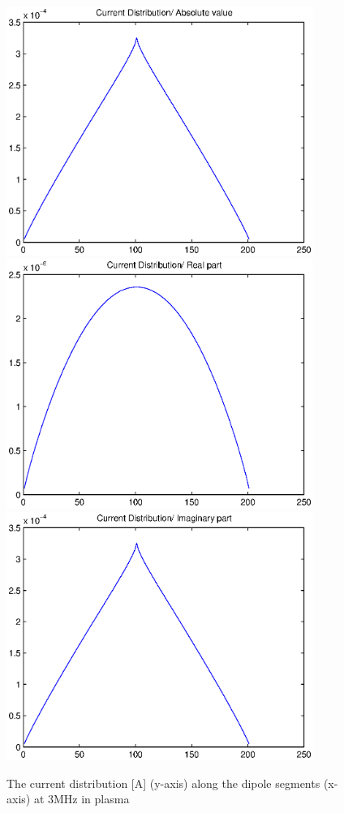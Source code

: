 \documentclass[a4paper,11pt]{thesis}
\begin{document}
\begin{figure}
 \begin{center}
\includegraphics[width=10.0cm]{DissPics/curr_abs_3mh_p.eps}
 \includegraphics[width=10.0cm]{DissPics/curr_re_3mh_p.eps}
 \includegraphics[width=10.0cm]{DissPics/curr_im_3mh_p.eps}\end{center}
  \caption{The current distribution [A] (y-axis) along the dipole segments (x-axis) at 3MHz in plasma}\label{fig:curr_3mh_pl}
\end{figure}
\end{document}
